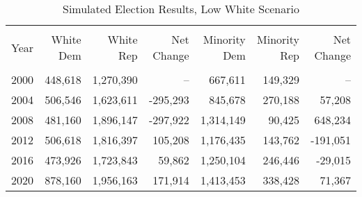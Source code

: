 \begin{table}[ht]
\centering
\begin{threeparttable}
\caption{Simulated Election Results, Low White Scenario}  
\label{tab:lo-white}
\begin{tabular}{rrrrrrr}
  \hline \\ \vspace{0.5em} 
Year & White Dem & White Rep & Net Change & Minority Dem  & Minority Rep  & Net Change \vspace{0.5em} \\ 
  \hline   \\
  2000 & 448,618 & 1,270,390 &   -- & 667,611 & 149,329 &  -- \\ 
  2004 & 506,546 & 1,623,611 & -295,293 & 845,678 & 270,188 & 57,208 \\ 
  2008 & 481,160 & 1,896,147 & -297,922 & 1,314,149 & 90,425 & 648,234 \\ 
  2012 & 506,618 & 1,816,397 & 105,208 & 1,176,435 & 143,762 & -191,051 \\ 
  2016 & 473,926 & 1,723,843 & 59,862 & 1,250,104 & 246,446 & -29,015 \\ 
  2020 & 878,160 & 1,956,163 & 171,914 & 1,413,453 & 338,428 & 71,367     \vspace{0.5em} \\ 
   \hline

\end{tabular}
\end{threeparttable}

\end{table}



